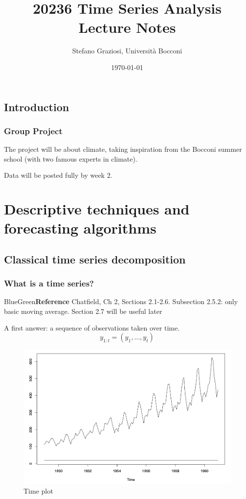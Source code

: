 \documentclass[dvipsnames,12pt]{book}
\title{20236 Time Series Analysis \\[1cm] \textbf{Lecture Notes}}
\author{Stefano Graziosi, Università Bocconi}
\date{\today}
\begin{document}
\maketitle

\tableofcontents

\chapter*{Introduction}

    \section*{Group Project}

        The project will be about climate, taking inspiration from the Bocconi summer school (with two famous experts in climate).

        \noindent Data will be posted fully by week 2.

        

\part{Descriptive techniques and forecasting algorithms}

    \chapter{Classical time series decomposition}

            \section{What is a time series?}

                \begin{mybox}{BlueGreen}{\textbf{Reference}}
                    Chatfield, Ch 2, Sections 2.1-2.6. Subsection 2.5.2: only basic moving average. Section 2.7 will be useful later
                \end{mybox}

                A first answer: a sequence of observations taken over time.
                \begin{equation}
                    y_{1:t} = (y_1, \ldots, y_t)
                \end{equation}

                \begin{figure}[h]
                    \centering
                    \includegraphics[width=0.48\linewidth]{L1-1.png}
                    \caption{Time plot}
                    \label{fig:L1-1}
                \end{figure}
\end{document}
